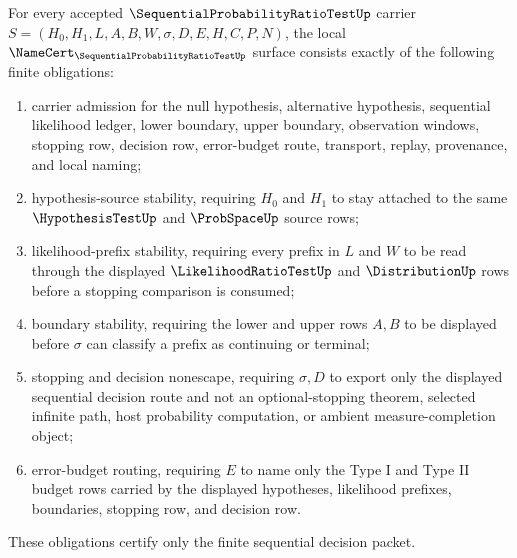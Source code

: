 \begin{theorem}
\label{thm:sequential-probability-ratio-test-namecert-obligations}
For every accepted $\SequentialProbabilityRatioTestUp$ carrier $S=(H_0,H_1,L,A,B,W,\sigma,D,E,H,C,P,N)$, the local $\NameCert_{\SequentialProbabilityRatioTestUp}$ surface consists exactly of the following finite obligations:
\begin{enumerate}
\item carrier admission for the null hypothesis, alternative hypothesis, sequential likelihood ledger, lower boundary, upper boundary, observation windows, stopping row, decision row, error-budget route, transport, replay, provenance, and local naming;
\item hypothesis-source stability, requiring $H_0$ and $H_1$ to stay attached to the same $\HypothesisTestUp$ and $\ProbSpaceUp$ source rows;
\item likelihood-prefix stability, requiring every prefix in $L$ and $W$ to be read through the displayed $\LikelihoodRatioTestUp$ and $\DistributionUp$ rows before a stopping comparison is consumed;
\item boundary stability, requiring the lower and upper rows $A,B$ to be displayed before $\sigma$ can classify a prefix as continuing or terminal;
\item stopping and decision nonescape, requiring $\sigma,D$ to export only the displayed sequential decision route and not an optional-stopping theorem, selected infinite path, host probability computation, or ambient measure-completion object;
\item error-budget routing, requiring $E$ to name only the Type I and Type II budget rows carried by the displayed hypotheses, likelihood prefixes, boundaries, stopping row, and decision row.
\end{enumerate}
These obligations certify only the finite sequential decision packet.
\end{theorem}
